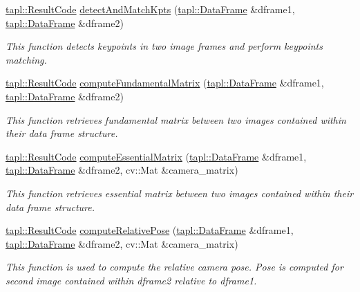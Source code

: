 \begin{DoxyCompactItemize}
\hyperlink{namespacetapl_a196ce1d5bf399fc26f03797e6a8d03ff}{tapl\+::\+Result\+Code} \hyperlink{namespacetapl_1_1cve_a34cb000d47a121549e81900da9913299}{detect\+And\+Match\+Kpts} (\hyperlink{structtapl_1_1DataFrame}{tapl\+::\+Data\+Frame} \&dframe1, \hyperlink{structtapl_1_1DataFrame}{tapl\+::\+Data\+Frame} \&dframe2)
\begin{DoxyCompactList}\small\item\em This function detects keypoints in two image frames and perform keypoints matching. \end{DoxyCompactList}\item 
\hyperlink{namespacetapl_a196ce1d5bf399fc26f03797e6a8d03ff}{tapl\+::\+Result\+Code} \hyperlink{namespacetapl_1_1cve_a8e1c9ef8d5eae6975b5e7e7c360fc1e8}{compute\+Fundamental\+Matrix} (\hyperlink{structtapl_1_1DataFrame}{tapl\+::\+Data\+Frame} \&dframe1, \hyperlink{structtapl_1_1DataFrame}{tapl\+::\+Data\+Frame} \&dframe2)
\begin{DoxyCompactList}\small\item\em This function retrieves fundamental matrix between two images contained within their data frame structure. \end{DoxyCompactList}\item 
\hyperlink{namespacetapl_a196ce1d5bf399fc26f03797e6a8d03ff}{tapl\+::\+Result\+Code} \hyperlink{namespacetapl_1_1cve_a30da40f2aa0e434425c7b14f23b59457}{compute\+Essential\+Matrix} (\hyperlink{structtapl_1_1DataFrame}{tapl\+::\+Data\+Frame} \&dframe1, \hyperlink{structtapl_1_1DataFrame}{tapl\+::\+Data\+Frame} \&dframe2, cv\+::\+Mat \&camera\+\_\+matrix)
\begin{DoxyCompactList}\small\item\em This function retrieves essential matrix between two images contained within their data frame structure. \end{DoxyCompactList}\item 
\hyperlink{namespacetapl_a196ce1d5bf399fc26f03797e6a8d03ff}{tapl\+::\+Result\+Code} \hyperlink{namespacetapl_1_1cve_ad8314ef8898d3a90c6d93a514bf75d20}{compute\+Relative\+Pose} (\hyperlink{structtapl_1_1DataFrame}{tapl\+::\+Data\+Frame} \&dframe1, \hyperlink{structtapl_1_1DataFrame}{tapl\+::\+Data\+Frame} \&dframe2, cv\+::\+Mat \&camera\+\_\+matrix)
\begin{DoxyCompactList}\small\item\em This function is used to compute the relative camera pose. Pose is computed for second image contained within dframe2 relative to dframe1. \end{DoxyCompactList}\end{DoxyCompactItemize}


